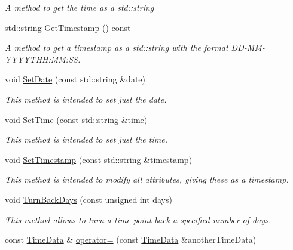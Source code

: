 \begin{DoxyCompactItemize}
\begin{DoxyCompactList}\small\item\em A method to get the time as a {\ttfamily std\+::string} \end{DoxyCompactList}\item 
\mbox{\label{structTimeData_a06956ece691807dc69e4fe6add2bd423}} 
std\+::string \hyperlink{structTimeData_a06956ece691807dc69e4fe6add2bd423}{Get\+Timestamp} () const
\begin{DoxyCompactList}\small\item\em A method to get a timestamp as a {\ttfamily std\+::string} with the format D\+D-\/\+M\+M-\/\+Y\+Y\+Y\+Y\+T\+HH\+:MM\+:SS. \end{DoxyCompactList}\item 
void \hyperlink{structTimeData_ac4a84f214fbaeaac5fa77df2c68bad79}{Set\+Date} (const std\+::string \&date)
\begin{DoxyCompactList}\small\item\em This method is intended to set just the date. \end{DoxyCompactList}\item 
void \hyperlink{structTimeData_a79c359b6aa1d5362065105d0e6b2f657}{Set\+Time} (const std\+::string \&time)
\begin{DoxyCompactList}\small\item\em This method is intended to set just the time. \end{DoxyCompactList}\item 
void \hyperlink{structTimeData_a753d18acb1fdebbde3e910e2462b4073}{Set\+Timestamp} (const std\+::string \&timestamp)
\begin{DoxyCompactList}\small\item\em This method is intended to modify all attributes, giving these as a timestamp. \end{DoxyCompactList}\item 
void \hyperlink{structTimeData_ad204062485d50c24aad1d4b41a582bd8}{Turn\+Back\+Days} (const unsigned int days)
\begin{DoxyCompactList}\small\item\em This method allows to turn a time point back a specified number of days. \end{DoxyCompactList}\item 
const \hyperlink{structTimeData}{Time\+Data} \& \hyperlink{structTimeData_afa65d92842691d57ee5e2428f2156eef}{operator=} (const \hyperlink{structTimeData}{Time\+Data} \&another\+Time\+Data)

\end{DoxyCompactItemize}
